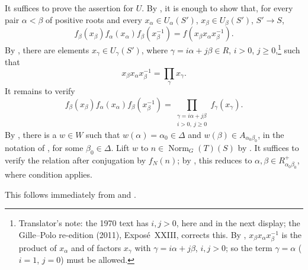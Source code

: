 It suffices to prove the assertion for \(U\). By ,
it is enough to show that, for every pair \(\alpha<\beta\) of positive
roots and every \(x_\alpha\in U_\alpha(S')\),
\(x_\beta\in U_\beta(S')\), \(S'\to S\),
\[
  f_\beta(x_\beta)f_\alpha(x_\alpha)f_\beta(x_\beta^{-1})
   =f(x_\beta x_\alpha x_\beta^{-1}).
\]
By , there are elements
\(x_\gamma\in U_\gamma(S')\), where
\(\gamma=i\alpha+j\beta\in R\), \(i>0\), \(j\geq0\),\footnote{Translator's note: the 1970 text has \(i,j>0\),
here and in the next display; the Gille--Polo re-edition (2011), Exposé~XXIII,
corrects this. By ,
\(x_\beta x_\alpha x_\beta^{-1}\) is the product of \(x_\alpha\) and of factors
\(x_\gamma\) with \(\gamma=i\alpha+j\beta\), \(i,j>0\); so the term \(\gamma=\alpha\)
(\(i=1\), \(j=0\)) must be allowed.} such that
\[
  x_\beta x_\alpha x_\beta^{-1}=\prod_\gamma x_\gamma.
\]
It remains to verify
\[
  f_\beta(x_\beta)f_\alpha(x_\alpha)f_\beta(x_\beta^{-1})
   =
  \prod_{\substack{\gamma=i\alpha+j\beta\\i>0,\ j\geq0}}
  f_\gamma(x_\gamma).
\]
By , there is a \(w\in W\) such that
\(w(\alpha)=\alpha_0\in\Delta\) and
\(w(\beta)\in A_{\alpha_0\beta_0}\), in the notation of , for
some \(\beta_0\in\Delta\). Lift \(w\) to
\(n\in\operatorname{Norm}_G(T)(S)\) by . It suffices
to verify the relation after conjugation by \(f_N(n)\); by ,
this reduces to \(\alpha,\beta\in R^+_{\alpha_0\beta_0}\), where
condition  applies.

This follows immediately from  and .


